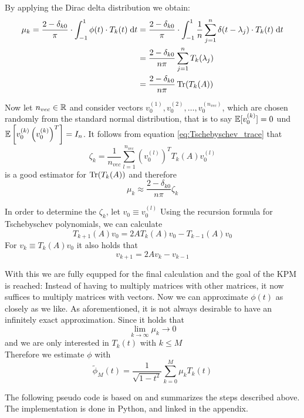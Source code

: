 By applying the Dirac delta distribution we obtain:
\begin{align*}
    \mu_k = \frac{2 - \delta_{k0}}{\pi} \cdot \int_{-1}^1 \phi(t) \cdot T_k(t) \;\mathrm{d}t &= \frac{2 - \delta_{k0}}{\pi} \cdot \int_{-1}^1 \frac{1}{n} \sum_{j = 1}^n \delta(t - \lambda_j) \cdot T_k(t) \;\mathrm{d}t \\
    &= \frac{2 - \delta_{k0}}{n \pi} \sum_{j = 1}^n T_k(\lambda_j)\\
    &= \frac{2 - \delta_{k0}}{n \pi} \operatorname{Tr}(T_k(A))
\end{align*}

Now let $n_{vec} \in \mathbb{R}$ and consider vectors $v_0^{(1)}, v_0^{(2)}, \dots, v_0^{(n_{vec})}$,
which are chosen randomly from the standard normal distribution,
that is to say $\mathbb{E}[v_0^{(k)}] = 0$ und $\mathbb{E}\left[v_0^{(k)}\left(v_0^{(k)}\right)^T\right] = I_n$.
It follows from equation \ref{eq:Tschebyschev_trace} that
\[
\zeta_k = \frac{1}{n_{vec}} \sum_{l = 1}^{n_{vec}} \left( v_0^{(l)} \right)^T T_k(A) v_0^{(l)}
\]
is a good estimator for $\operatorname{Tr}(T_k(A))$ and therefore
\[
\mu_k \approx \frac{2 - \delta_{k0}}{n \pi} \zeta_k
\]

In order to determine the $\zeta_k$, let $v_0 \equiv v_0^{(l)}$
Using the recursion formula for Tschebyschev polynomials, we can calculate
\[
T_{k + 1}(A)v_0 = 2 A T_k(A) v_0 - T_{k - 1}(A) v_0
\]
For $v_k \equiv T_k(A)v_0$ it also holds that
\[
v_{k + 1} = 2 A v_k - v_{k - 1}
\]

With this we are fully equpped for the final calculation and the goal of the KPM is reached:
Instead of having to multiply matrices with other matrices, it now suffices to multiply matrices with vectors.
Now we can approximate $\phi(t)$ as closely as we like.
As aforementioned, it is not always desirable to have an infinitely exact approximation.
Since it holds that
\[
\lim \limits_{k \to \infty} \mu_k \to 0
\]
and we are only interested in $T_k(t)$ with $k \leq M$\\
Therefore we estimate $\phi$ with
\begin{equation} \label{eq:Angenäherte Spektraldichte}
    \tilde{\phi}_M(t) = \frac{1}{\sqrt{1 - t^2}} \sum_{k = 0}^{M} \mu_k T_k(t)
\end{equation}

The following pseudo code is based on \cite[p.~10]{linsaadyang14} and summarizes the steps described above.
The implementation is done in Python, and linked in the appendix.

